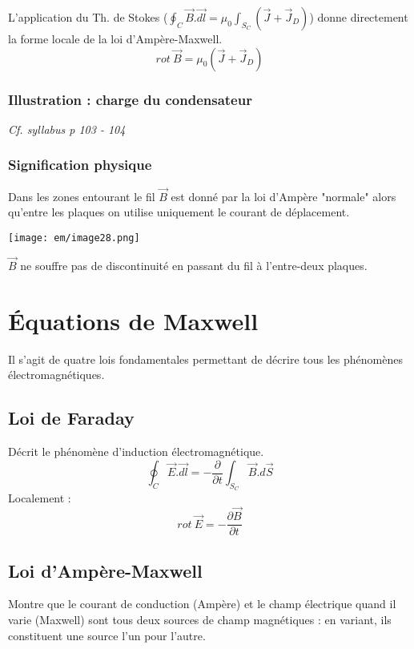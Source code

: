 \documentclass[british,french,11pt, a4paper, openany]{book}
\begin{document}
	L'application du Th. de Stokes ($\oint_C \vec{B}.\vec{dl} = \mu_0 \int_{S_C}(\vec{J} + \vec{J}_D)$)  donne directement la forme locale de la loi d'Ampère-Maxwell.
	\begin{equation}
		rot\ \vec{B} = \mu_0 (\vec{J} + \vec{J}_D)
	\end{equation}
	
	\subsubsection{Illustration : charge du condensateur}
	\textit{Cf. syllabus p 103 - 104}
	
	\subsubsection*{Signification physique}
	Dans les zones entourant le fil $\vec{B}$ est donné par la loi d'Ampère "normale" alors qu'entre les plaques on utilise uniquement le courant de déplacement.
	\begin{center}
		\texttt{[image: em/image28.png]}\\
	\end{center}
	$\vec{B}$ ne souffre pas de discontinuité en passant du fil à l'entre-deux plaques.
	\newpage
	\section{Équations de Maxwell}
	Il s'agit de quatre lois fondamentales permettant de décrire tous les phénomènes électromagnétiques.
	
	\subsection{Loi de Faraday}
	Décrit le phénomène d'induction électromagnétique.
	\begin{equation}
		\oint_C \vec{E}.\vec{dl} = -\frac{\partial}{\partial t} \int_{S_C} \vec{B}.d\vec{S}
	\end{equation}
	Localement :
	\begin{equation}
		rot\ \vec{E} = -\frac{\partial\vec{B}}{\partial t}
	\end{equation}
	
	\subsection{Loi d'Ampère-Maxwell}
	Montre que le courant de conduction (Ampère) et le champ électrique quand il varie (Maxwell) sont tous deux sources de champ magnétiques : en variant, ils constituent une source l'un pour l'autre.
	
\end{document}
